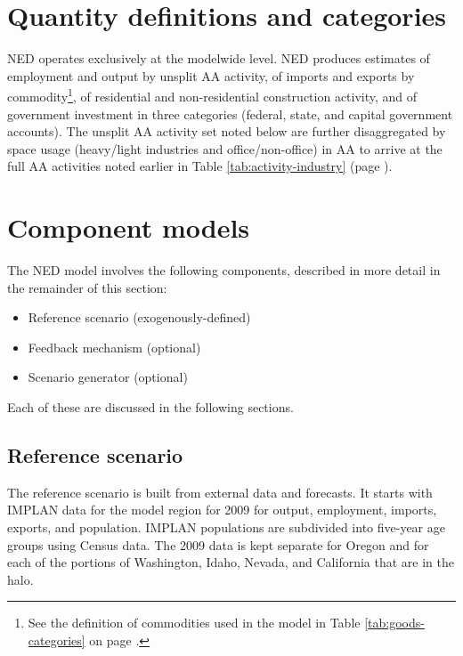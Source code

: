 \section{Quantity definitions and categories}
NED operates exclusively at the modelwide level. NED produces estimates of employment and output by unsplit AA activity, of imports and exports by commodity\footnote{See the definition of commodities used in the model in Table \ref{tab:goods-categories} on page \pageref{tab:goods-categories}.}, of residential and non-residential construction activity, and of government investment in three categories (federal, state, and capital government accounts). The unsplit AA activity set noted below are further disaggregated by space usage (heavy/light industries and office/non-office) in AA to arrive at the full AA activities noted earlier in Table \ref{tab:activity-industry} (page \pageref{tab:activity-industry}).

\section{Component models}

The NED model involves the following components, described in more detail in the remainder of this section:
\begin{itemize}
\item Reference scenario (exogenously-defined)
\item Feedback mechanism (optional) 
\item Scenario generator (optional)
\end{itemize}
\noindent Each of these are discussed in the following sections.

\subsection{Reference scenario}
The reference scenario is built from external data and forecasts. It starts with IMPLAN data for the model region for 2009 for output, employment, imports, exports, and population. IMPLAN populations are subdivided into five-year age groups using Census data. The 2009 data is kept separate for Oregon and for each of the portions of Washington, Idaho, Nevada, and California that are in the halo. 

